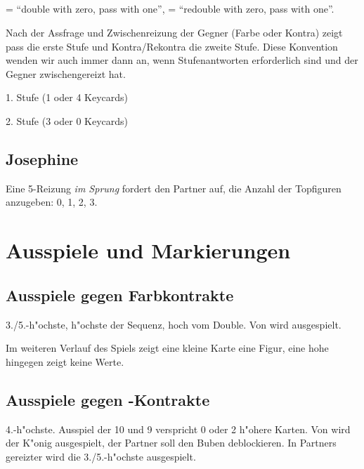 \subsection{}

 = ``double with zero, pass with one'',  =
``redouble with zero, pass with one''.

Nach der Assfrage und Zwischenreizung der Gegner (Farbe oder Kontra) zeigt pass
die erste Stufe und Kontra/Rekontra die zweite Stufe. Diese Konvention wenden
wir auch immer dann an, wenn Stufenantworten erforderlich sind und der Gegner
zwischengereizt hat.
%
\bdsc
  \item[pass] 1. Stufe (1 oder 4 Keycards)
  \item[\kontra/\rekontra] 2. Stufe (3 oder 0 Keycards)
\edsc

\subsection{Josephine}

Eine 5\SA-Reizung \emph{im Sprung} fordert den Partner auf, die Anzahl der
Topfiguren anzugeben: 0, 1, 2, 3.

\newpage
\section{Ausspiele und Markierungen}

\subsection{Ausspiele gegen Farbkontrakte}

3./5.-h"ochste, h"ochste der Sequenz, hoch vom Double.
Von  wird  ausgespielt.

Im weiteren Verlauf des Spiels zeigt eine kleine Karte eine
Figur, eine hohe hingegen zeigt keine Werte.

\subsection{Ausspiele gegen \sa-Kontrakte}

4.-h"ochste. Ausspiel der 10 und 9 verspricht 0 oder 2 h"ohere Karten. Von
 wird der K"onig ausgespielt, der Partner soll den Buben deblockieren. In
Partners gereizter wird die 3./5.-h"ochste ausgespielt.

